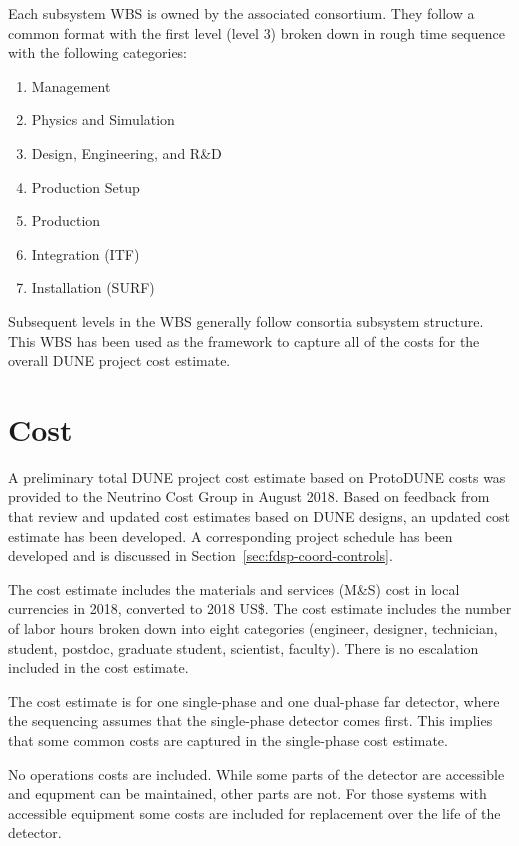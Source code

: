 Each subsystem WBS is owned by the associated consortium. They follow a common format with the first level (level 3) broken down in rough time sequence with the following categories:
\begin{enumerate}
  \item Management
  \item Physics and Simulation
  \item Design, Engineering, and R\&D
  \item Production Setup
  \item Production
  \item Integration (ITF)
  \item Installation (SURF)
\end{enumerate}
Subsequent levels in the WBS generally follow consortia subsystem structure.
This WBS has been used as the framework to capture all of the costs
for the overall DUNE project cost estimate.

\section{Cost}
\label{sec:fdsp-coord-cost}

A preliminary total DUNE project cost estimate based on ProtoDUNE
costs was provided to the Neutrino Cost Group in August 2018. Based on
feedback from that review and updated cost estimates based on DUNE
designs, an updated cost estimate has been developed. A corresponding
project schedule has been developed and is discussed in
Section~\ref{sec:fdsp-coord-controls}.

The cost estimate includes the materials and services (M\&S) cost in
local currencies in 2018, converted to 2018 US\$. The cost estimate
includes the number of labor hours broken down into eight categories
(engineer, designer, technician, student, postdoc, graduate student,
scientist, faculty). There is no escalation included in the cost estimate.

The cost estimate is for one single-phase and one dual-phase far
detector, where the sequencing assumes that the single-phase detector
comes first. This implies that some common costs are captured in the
single-phase cost estimate.

No operations costs are included. While some parts of the detector are
accessible and equpment can be maintained, other parts are not. For
those systems with accessible equipment some costs are included for
replacement over the life of the detector.

